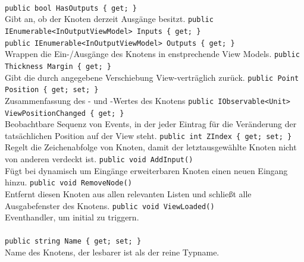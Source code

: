 \paragraph{}
\begin{itemize}
	\add \verb!public bool HasOutputs { get; }! \\
	Gibt an, ob der Knoten derzeit Ausgänge besitzt.
	\add \verb!public IEnumerable<InOutputViewModel> Inputs { get; }! \\
	\verb!public IEnumerable<InOutputViewModel> Outputs { get; }! \\
	Wrappen die Ein-/Ausgänge des Knotens in enstprechende View Models.
	\add \verb!public Thickness Margin { get; }! \\
	Gibt die durch  angegebene Verschiebung View-verträglich zurück.
	\add \verb!public Point Position { get; set; }! \\
	Zusammenfassung des - und -Wertes des Knotens
	\add \verb!public IObservable<Unit> ViewPositionChanged { get; }! \\
	Beobachtbare Sequenz von Events, in der jeder Eintrag für die Veränderung der tatsächlichen Position auf der View steht.
	\add \verb!public int ZIndex { get; set; }! \\
	Regelt die Zeichenabfolge von Knoten, damit der letztausgewählte Knoten nicht von anderen verdeckt ist.
	\add \verb!public void AddInput()! \\
	Fügt bei dynamisch um Eingänge erweiterbaren Knoten einen neuen Eingang hinzu.
	\add \verb!public void RemoveNode()! \\
	Entfernt diesen Knoten aus allen relevanten Listen und schließt alle Ausgabefenster des Knotens.
	\add \verb!public void ViewLoaded()! \\
	Eventhandler, um  initial zu triggern.
\end{itemize}

\paragraph{}
\begin{itemize}
	\add \verb!public string Name { get; set; }! \\
	Name des Knotens, der lesbarer ist als der reine Typname.
\end{itemize}

